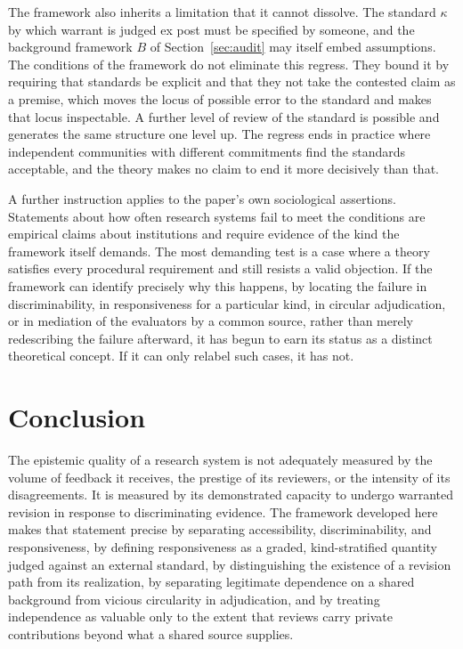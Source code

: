 \documentclass[11pt]{article}
\theoremstyle{remark}
\begin{document}
The framework also inherits a limitation that it cannot dissolve. The standard $\kappa$ by which warrant is judged ex post must be specified by someone, and the background framework $B$ of Section~\ref{sec:audit} may itself embed assumptions. The conditions of the framework do not eliminate this regress. They bound it by requiring that standards be explicit and that they not take the contested claim as a premise, which moves the locus of possible error to the standard and makes that locus inspectable. A further level of review of the standard is possible and generates the same structure one level up. The regress ends in practice where independent communities with different commitments find the standards acceptable, and the theory makes no claim to end it more decisively than that.

A further instruction applies to the paper's own sociological assertions. Statements about how often research systems fail to meet the conditions are empirical claims about institutions and require evidence of the kind the framework itself demands. The most demanding test is a case where a theory satisfies every procedural requirement and still resists a valid objection. If the framework can identify precisely why this happens, by locating the failure in discriminability, in responsiveness for a particular kind, in circular adjudication, or in mediation of the evaluators by a common source, rather than merely redescribing the failure afterward, it has begun to earn its status as a distinct theoretical concept. If it can only relabel such cases, it has not.

\section{Conclusion}

The epistemic quality of a research system is not adequately measured by the volume of feedback it receives, the prestige of its reviewers, or the intensity of its disagreements. It is measured by its demonstrated capacity to undergo warranted revision in response to discriminating evidence. The framework developed here makes that statement precise by separating accessibility, discriminability, and responsiveness, by defining responsiveness as a graded, kind-stratified quantity judged against an external standard, by distinguishing the existence of a revision path from its realization, by separating legitimate dependence on a shared background from vicious circularity in adjudication, and by treating independence as valuable only to the extent that reviews carry private contributions beyond what a shared source supplies.
\end{document}
